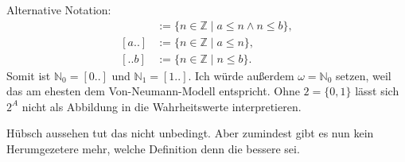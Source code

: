 \documentclass[a4paper,11pt,fleqn]{article}
\newcommand{\N}{\mathbb N}
\newcommand{\Z}{\mathbb Z}
\begin{document}
Alternative Notation:
\begin{align}
[a..b] &:= \{n\in\Z\mid a\le n\wedge n\le b\},\\
[a..]  &:= \{n\in\Z\mid a\le n\},\\
[..b]  &:= \{n\in\Z\mid n\le b\}.
\end{align}
Somit ist $\N_0=[0..]$ und $\N_1=[1..]$.
Ich würde außerdem $\omega=\N_0$ setzen, weil das am ehesten
dem Von-Neumann-Modell entspricht. Ohne $2=\{0,1\}$ lässt
sich $2^A$ nicht als Abbildung in die Wahrheitswerte
interpretieren.

Hübsch aussehen tut das nicht unbedingt. Aber zumindest gibt
es nun kein Herumgezetere mehr, welche Definition denn die bessere
sei.
\end{document}
